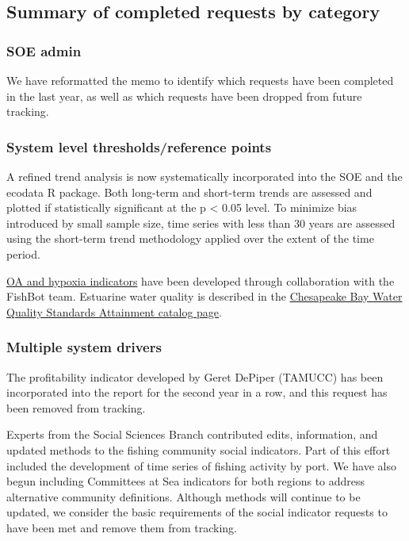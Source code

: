\documentclass[
  10pt,
]{article}
\begin{document}
\subsection{Summary of completed requests by
category}\label{summary-of-completed-requests-by-category}

\subsubsection{SOE admin}\label{soe-admin-1}

We have reformatted the memo to identify which requests have been
completed in the last year, as well as which requests have been dropped
from future tracking.

\subsubsection{System level thresholds/reference
points}\label{system-level-thresholdsreference-points-1}

A refined trend analysis is now systematically incorporated into the SOE
and the ecodata R package. Both long-term and short-term trends are
assessed and plotted if statistically significant at the p \textless{}
0.05 level. To minimize bias introduced by small sample size, time
series with less than 30 years are assessed using the short-term trend
methodology applied over the extent of the time period.

\href{placeholder\%20URL\%20for\%20catalog}{OA and hypoxia indicators}
have been developed through collaboration with the FishBot team.
Estuarine water quality is described in the
\href{https://noaa-edab.github.io/catalog/ches_bay_wq.html}{Chesapeake
Bay Water Quality Standards Attainment catalog page}.

\subsubsection{Multiple system drivers}\label{multiple-system-drivers-1}

The profitability indicator developed by Geret DePiper (TAMUCC) has been
incorporated into the report for the second year in a row, and this
request has been removed from tracking.

Experts from the Social Sciences Branch contributed edits, information,
and updated methods to the fishing community social indicators. Part of
this effort included the development of time series of fishing activity
by port. We have also begun including Committees at Sea indicators for
both regions to address alternative community definitions. Although
methods will continue to be updated, we consider the basic requirements
of the social indicator requests to have been met and remove them from
tracking.
\end{document}
